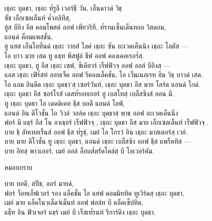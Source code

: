 \begin{leader}
\end{leader}

\begin{thaitrans}
เธฺอะ บุดธา, เธฺอะ ท๎รูลี เวอร์ธฺี วัน, เอ็นดาวด์ วิธฺ\\
\vin ซัช เอ็กเซลเล็นท์ ค๎วอลิทีสฺ,\\
ฮูส บีอิง อีส คอมโพสด์ ออฟ เพียวริที, ท๎รานเซ็นเด็นทอล วิสดอม,\\
\vin แอนด์ ค็อมแพสชั่น,\\
ฮู แฮส เอ็นไลทึ่นด์ เธฺอะ วายส์ ไลค์ เธฺอะ ซัน อะเวคเค็นนิง เธฺอะ โลตัส —\\
ไอ บาว มาย เฮด ทู แธฺท พีสฟูล์ ชีฟ ออฟ คองเคอเรอร๎สฺ.\\
เธฺอะ บุดธา, ฮู อีส เธฺอะ เซฟ, ซีเคียวร์ เร็ฟฟิวจฺ  ออฟ ออล์ บีอิงสฺ —\\
แอส เธฺอะ เฟิร๎สท์ ออบเจ็ค ออฟ รีคอลเล็คชั่น, ไอ เว็นเนอเรท ฮิม วิธฺ บาวด์ เฮด.\\
ไอ แอม อินดีด เธฺอะ บุดธา’สฺ เซอร์วันท์, เธฺอะ บุดธา อีส มาย โลร์ด แอนด์ ไกด์.\\
เธฺอะ บุดธา อีส ซอร์โรส์ เดสท๎รอยเยอร์ ฮู   เบสโทสฺ  เบล็สซิงส์ ออน มี.\\
ทู เธฺอะ บุดธา ไอ เดดดิเคท ธฺีส บอดี แอนด์ ไลฟ์,\\
แอนด์ อิน ดีโวชั่น ไอ วิวล์ วอล์ค เธฺอะ บุดธาสฺ  พาธ ออฟ อะเวคเค็นนิ่ง\\
ฟอร์ มี แธฺร์ อีส โน อาเธฺอร์ เร็ฟฟิวจฺ , เธฺอะ บุดธา อีส มาย เอ็กเซลเล็นท์ เร็ฟฟิวจฺ .\\
บาย ธฺิ อัทเทอเร็นส์ ออฟ ธฺีส ท๎รูธฺ์, เมย์ ไอ โกรว์ อิน เธฺอะ มาสเตอร์สฺ  เวย์.\\
บาย มาย ดีโวชั่น ทู เธฺอะ บุดธา, แอนด์ เธฺอะ เบล็สซิง ออฟ ธฺีส แพร็คทิส —\\
บาย อิทสฺ  พาวเออร์, เมย์ ออล์ อ็อบส๎ตรัคโคล์สฺ บี โอเวอร์คัม.\\
\end{thaitrans}

\begin{instruction}
หมอบกราบ
\end{instruction}

\begin{thaitrans}
บาย บอดี, สปีช, ออร์ มายด์,\\
ฟอร์ ว็อทเอ็ฟเวอร์ รอง แอ็คชั่น ไอ แฮฟ คอมมิททิด ทูเวิร์ดสฺ  เธฺอะ บุดธา,\\
เมย์ มาย แอ็คโนวฺเล็ดจ์เม็นท์ ออฟ ฟอล์ท บี แอ็คเซ็ปทิด,\\
แธฺ็ท อิน ฟิวเจอร์ แธฺร์ เมย์ บี เร็สเท๎รนท์ รีการ์ดิง เธฺอะ บุดธา.\\
\end{thaitrans}
\clearpage

